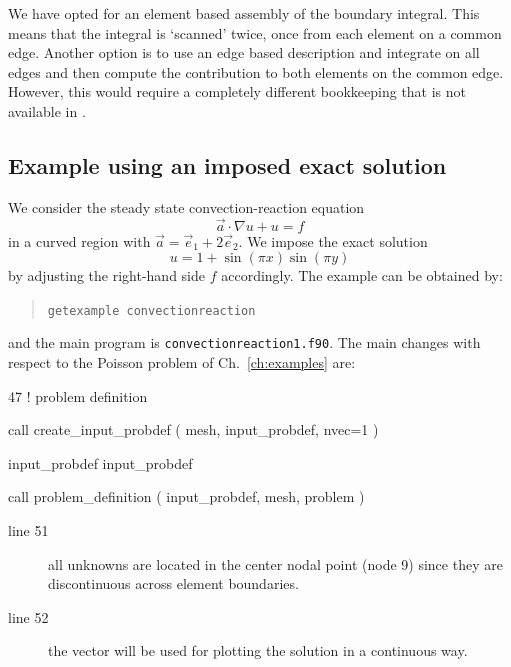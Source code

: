 We have opted for an element based assembly of the boundary integral. This
means that the integral is `scanned' twice, once from each element on a common
edge. Another option is to use an edge based description and integrate on all
edges and then compute the contribution to both elements on the common edge.
However, this would require a completely different bookkeeping that is
not available in \tfem.

\subsection{Example using an imposed exact solution}

We consider the steady state convection-reaction equation 
\begin{equation}
     \vec a\cdot\nabla u + u = f
\end{equation}
in a curved region with $\vec a=\vec e_1+2\vec e_2$. We impose the exact
solution
\begin{equation}
     u=1+\sin(\pi x)\sin(\pi y)
\end{equation}
by adjusting the right-hand side $f$ accordingly. The example can be obtained
by:
\begin{quote}
   \texttt{getexample convectionreaction}
\end{quote}
and the main program is \texttt{convectionreaction1.f90}. The main changes with
respect to the Poisson problem of Ch.~\ref{ch:examples} are:

\begin{listing}{47}
! problem definition
                                                                                
  call create_input_probdef ( mesh, input_probdef, nvec=1 )
                                                                                
  input_probdef%
  input_probdef%
                                                                                
  call problem_definition ( input_probdef, mesh, problem )
                                                                                
\end{listing}
\begin{description}
   \item[line 51] all unknowns are located in the center nodal point (node 9)
since they are discontinuous across element boundaries.
   \item[line 52] the vector will be used for plotting the solution in a
continuous way.
\end{description}

